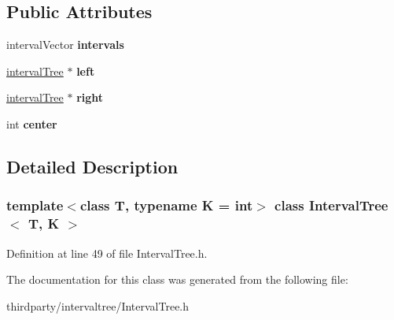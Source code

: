 \subsection*{Public Attributes}
\begin{DoxyCompactItemize}
\item 
\mbox{\label{class_interval_tree_a6fa7ea51dd9a1782415bb47b79e6a731}} 
interval\+Vector {\bfseries intervals}
\item 
\mbox{\label{class_interval_tree_a4db5860384fe192a005b196a2391e6ca}} 
\hyperlink{class_interval_tree}{interval\+Tree} $\ast$ {\bfseries left}
\item 
\mbox{\label{class_interval_tree_a3f543306e95275999a81c62f752fa8fe}} 
\hyperlink{class_interval_tree}{interval\+Tree} $\ast$ {\bfseries right}
\item 
\mbox{\label{class_interval_tree_abe996f63533dc8b07aefb3a309d6f67b}} 
int {\bfseries center}
\end{DoxyCompactItemize}


\subsection{Detailed Description}
\subsubsection*{template$<$class T, typename K = int$>$\newline
class Interval\+Tree$<$ T, K $>$}



Definition at line 49 of file Interval\+Tree.\+h.



The documentation for this class was generated from the following file\+:\begin{DoxyCompactItemize}
\item 
thirdparty/intervaltree/Interval\+Tree.\+h\end{DoxyCompactItemize}
